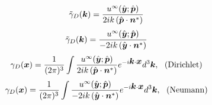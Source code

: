 \begin{equation}
	\tilde{\gamma}_D(\mbox{\boldmath $k$}) = 
	\frac{
		u^{\infty}(\hat{\mbox{\boldmath $y$}};\hat{\mbox{\boldmath $p$}})
	}{
		2ik\left(\hat{\mbox{\boldmath $p$}}\cdot \mbox{\boldmath $n$}^*\right)
	}
	\label{eqn:ZZZ_gmmk_D}
\end{equation}
\begin{equation}
	\tilde{\gamma}_D(\mbox{\boldmath $k$}) = 
	\frac{
		u^{\infty}(\hat{\mbox{\boldmath $y$}};\hat{\mbox{\boldmath $p$}})
	}{
		-2ik\left(\hat{\mbox{\boldmath $y$}}\cdot \mbox{\boldmath $n$}^*\right)
	}
	\label{eqn:ZZZ_gmmk_N}
\end{equation}
\begin{equation}
	\gamma_D(\mbox{\boldmath $x$}) = 
	\frac{1}{(2\pi)^3}\int
	\frac{
		u^{\infty}(\hat{\mbox{\boldmath $y$}};\hat{\mbox{\boldmath $p$}})
	}{
		2ik\left(\hat{\mbox{\boldmath $p$}}\cdot \mbox{\boldmath $n$}^*\right)
	}e^{-i\mbox{\boldmath $k$}\cdot\mbox{\boldmath $x$}}
	d^3\mbox{\boldmath $k$}, \ \ ({\rm Dirichlet})
	\label{eqn:ZZZ_gmmx_D}
\end{equation}
\begin{equation}
	\gamma_D(\mbox{\boldmath $x$}) = 
	\frac{1}{(2\pi)^3}\int
	\frac{
		u^{\infty}(\hat{\mbox{\boldmath $y$}};\hat{\mbox{\boldmath $p$}})
	}{
		-2ik\left(\hat{\mbox{\boldmath $y$}}\cdot \mbox{\boldmath $n$}^*\right)
	}e^{-i\mbox{\boldmath $k$}\cdot\mbox{\boldmath $x$}}
	d^3\mbox{\boldmath $k$}, \ \ ({\rm Neumann})
	\label{eqn:ZZZ_gmmx_N}
\end{equation}
